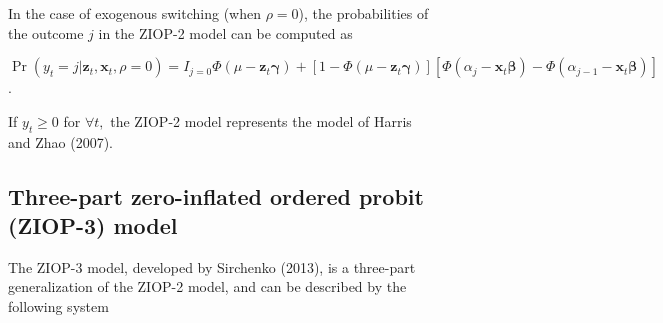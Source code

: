 \documentclass[letterpaper,fleqn,12pt]{article}
\begin{document}
\begin{figure}[H]
\begin{onehalfspace}
In the case of exogenous switching (when $\rho =0$), the probabilities of
the outcome $j$ in the ZIOP-2 model can be computed as

\begin{center}
$\Pr (y_{t}=j|\mathbf{z}_{t},\mathbf{x}_{t},\rho =0)=I_{j=0}\Phi (\mu -%
\mathbf{z}_{t}\mathbf{\gamma })+[1-\Phi (\mu -\mathbf{z}_{t}\mathbf{\gamma }%
)][\Phi (\alpha _{j}-\mathbf{x}_{t}\mathbf{\beta })-\Phi (\alpha _{j-1}-%
\mathbf{x}_{t}\mathbf{\beta })]$.
\end{center}

If $y_{t}\geq 0$ for $\forall t,$ the ZIOP-2 model represents the model of
Harris and Zhao (2007).

\subsection{Three-part zero-inflated ordered probit (ZIOP-3) model}

The ZIOP-3 model, developed by Sirchenko (2013), is a three-part
generalization of the ZIOP-2 model, and can be described by the following
system

\medskip


\end{onehalfspace}
\end{figure}
\end{document}
